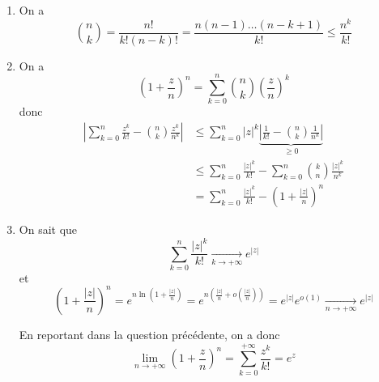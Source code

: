\begin{solution}
	\phantom{}
	\begin{enumerate}
		\item On a $$\binom{n}{k}=\frac{n!}{k!(n-k)!}=\frac{n(n-1)\dots(n-k+1)}{k!}\leqslant\boxed{\frac{n^{k}}{k!}}$$
		\item On a 
		$$\left(1+\frac{z}{n}\right)^{n}=\sum_{k=0}^{n}\binom{n}{k}\left(\frac{z}{n}\right)^{k}$$
		donc 
		\begin{align*}
			\left|\sum_{k=0}^{n}\frac{z^{k}}{k!}-\binom{n}{k}\frac{z^{k}}{n^{k}}\right|
			&\leqslant\sum_{k=0}^{n}\vert z\vert^{k}\underbrace{\left|\frac{1}{k!}-\binom{n}{k}\frac{1}{n^{k}}\right|}_{\geqslant0}\\
			&\leqslant\sum_{k=0}^{n}\frac{\left|z\right|^{k}}{k!}-\sum_{k=0}^{n}\binom{k}{n}\frac{\left|z\right|^{k}}{n^{k}}\\
			&\boxed{=\sum_{k=0}^{n}\frac{\left|z\right|^{k}}{k!}-\left(1+\frac{\left|z\right|}{n}\right)^{n}}
		\end{align*}

		\item On sait que 
		$$\sum_{k=0}^{n}\frac{\left|z\right|^{k}}{k!}\xrightarrow[k\to+\infty]{}e^{\left|z\right|}$$
		et 
		$$\left(1+\frac{\left|z\right|}{n}\right)^{n}=e^{n\ln\left(1+\frac{\left|z\right|}{n}\right)}=e^{n\left(\frac{\left|z\right|}{n}+o\left(\frac{\left|z\right|}{n}\right)\right)}=e^{\left|z\right|}e^{o\left(1\right)}\xrightarrow[n\to+\infty]{}e^{\left|z\right|}$$
		
		En reportant dans la question précédente, on a donc 
		$$\boxed{\lim\limits_{n\to+\infty}\left(1+\frac{z}{n}\right)^{n}=\sum_{k=0}^{+\infty}\frac{z^{k}}{k!}=e^{z}}$$
	\end{enumerate}
\end{solution}

